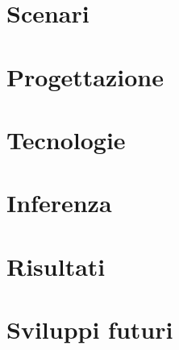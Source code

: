 \documentclass[a4paper,12pt]{article} %
\begin{document}
\section{Scenari}






\section{Progettazione}


\section{Tecnologie}


\section{Inferenza}


\section{Risultati}



\section{Sviluppi futuri}
\end{document}
